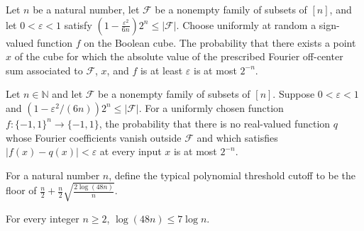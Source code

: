 \begin{theorem}
\label{FABL.measure_exists_prescribedFourierOffCenterFailure_le}
\leanok
{}
Let $n$ be a natural number, let $\mathcal F$ be a nonempty family of subsets of $[n]$,
and let $0<\varepsilon<1$ satisfy $\left(1-\frac{\varepsilon^2}{6n}\right)2^n\le
|\mathcal F|$. Choose uniformly at random a sign-valued function $f$ on the Boolean
cube. The probability that there exists a point $x$ of the cube for which the absolute
value of the prescribed Fourier off-center sum associated to $\mathcal F$, $x$, and $f$
is at least $\varepsilon$ is at most $2^{-n}$.
\end{theorem}

\begin{theorem}
\label{FABL.measure_not_hasPrescribedFourierUniformApproximation_le}
\leanok
{}
Let $n\in\mathbb{N}$ and let $\mathcal{F}$ be a nonempty family of subsets of $[n]$.
Suppose $0<\varepsilon<1$ and $\left(1-\varepsilon^2/(6n)\right)2^n\le |\mathcal{F}|$.
For a uniformly chosen function $f:\{-1,1\}^n\to\{-1,1\}$, the probability that there is
no real-valued function $q$ whose Fourier coefficients vanish outside $\mathcal{F}$ and
which satisfies $|f(x)-q(x)|<\varepsilon$ at every input $x$ is at most $2^{-n}$.
\end{theorem}

\begin{definition}
\label{FABL.typicalPolynomialThresholdCutoff}
\leanok
For a natural number $n$, define the typical polynomial threshold cutoff to be the floor
of $\frac n2+\frac n2\sqrt{\frac{2\log(48n)}{n}}$.
\end{definition}

\begin{theorem}
\label{FABL.log_48_mul_le_seven_log}
\leanok
{}
For every integer $n \ge 2$, $\log(48n) \le 7\log n$.
\end{theorem}

